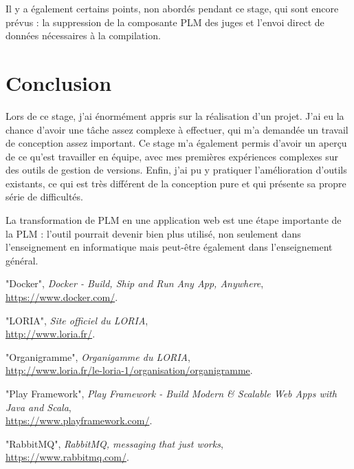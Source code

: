 \documentclass[stage]{tnreport}
\begin{document}
Il y a également certains points, non abordés pendant ce stage, qui sont encore prévus : la suppression de la composante PLM des juges et l'envoi direct de données nécessaires à la compilation.

\cleardoublepage

\chapter*{Conclusion}

Lors de ce stage, j'ai énormément appris sur la réalisation d'un projet. J'ai eu la chance d'avoir une tâche assez complexe à effectuer, qui m'a demandée un travail de conception assez important. Ce stage m'a également permis d'avoir un aperçu de ce qu'est travailler en équipe, avec mes premières expériences complexes sur des outils de gestion de versions. Enfin, j'ai pu y pratiquer l'amélioration d'outils existants, ce qui est très différent de la conception pure et qui présente sa propre série de difficultés.

La transformation de PLM en une application web est une étape importante de la PLM : l'outil pourrait devenir bien plus utilisé, non seulement dans l'enseignement en informatique mais peut-être également dans l'enseignement général.



\cleardoublepage

\begin{thebibliography}{5}

	"Docker",
	\emph{Docker - Build, Ship and Run Any App, Anywhere}, \hfill \\
	\url{https://www.docker.com/}.

	"LORIA",
	\emph{Site officiel du LORIA}, \hfill \\
	\url{http://www.loria.fr/}.

	"Organigramme",
	\emph{Organigamme du LORIA}, \hfill \\
	\url{http://www.loria.fr/le-loria-1/organisation/organigramme}.

	"Play Framework",
	\emph{Play Framework - Build Modern \& Scalable Web Apps with Java and Scala}, \hfill \\
	\url{https://www.playframework.com/}.

	"RabbitMQ",
	\emph{RabbitMQ, messaging that just works}, \hfill \\
	\url{https://www.rabbitmq.com/}.

\end{thebibliography}
\end{document}
